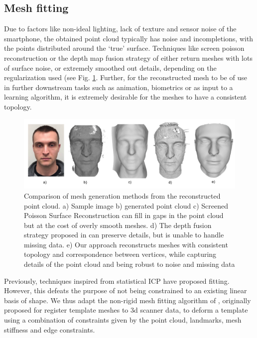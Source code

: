 \documentclass[10pt,twocolumn,letterpaper]{article}
\begin{document}
\subsection{Mesh fitting} \label{sec:mesh_fit}


Due to factors like non-ideal lighting, lack of texture and sensor noise of the smartphone, the obtained point cloud typically has noise and incompletions, with the points distributed around the `true' surface.
 Techniques like screen poisson reconstruction or the depth map fusion strategy of \cite{hernandez2015near} either return meshes with lots of surface noise, or extremely smoothed out details, depending on the regularization used (see Fig. \ref{fig:mesh_comp}. Further, for the reconstructed mesh to be of use in further downstream tasks such as animation, biometrics or as input to a learning algorithm, it is extremely desirable for the meshes to have a consistent topology. \\
 \begin{figure}[t]
\begin{center}
   \includegraphics[width=0.95\linewidth]{images/meshing_compare.png}
\end{center}
   \caption{Comparison of mesh generation methods from the reconstructed point cloud. a) Sample image b) generated point cloud c) Screened Poisson Surface Reconstruction\cite{kazhdan2013screened} can fill in gaps in the point cloud but at the cost of overly smooth meshes. d) The depth fusion strategy proposed in \cite{hernandez2015near} can preserve details, but is unable to handle missing data. e) Our approach reconstructs meshes with consistent topology and correspondence between vertices, while capturing details of the point cloud and being robust to noise and missing data }
\label{fig:mesh_comp}
\end{figure}

 Previously, techniques inspired from statistical ICP have proposed fitting. However, this defeats the purpose of not being constrained to an existing linear basis of shape.
 We thus adapt the non-rigid mesh fitting algorithm of \cite{amberg2007optimal}, originally proposed for register template meshes to 3d scanner data, to deform a template using a combination of constraints given by the point cloud, landmarks, mesh stiffness and edge constraints. 
\end{document}
